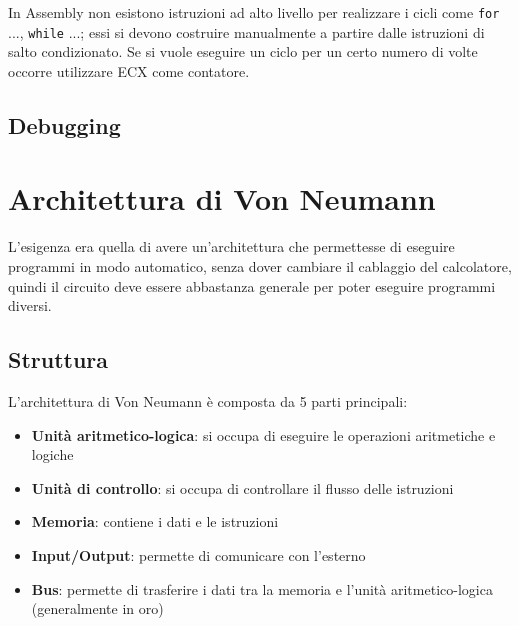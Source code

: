 \documentclass[a4paper]{article}
\theoremstyle{break}
\theoremstyle{break}
\theoremstyle{break}
\theoremstyle{break}
\begin{document}
\noindent In Assembly non esistono istruzioni ad alto livello per realizzare i cicli come \texttt{for} ...,
\texttt{while} ...; essi si devono costruire manualmente a partire dalle istruzioni di salto
condizionato. Se si vuole eseguire un ciclo per un certo numero di volte occorre utilizzare
ECX come contatore.

\subsection{Debugging}

\section{Architettura di Von Neumann}
L'esigenza era quella di avere un'architettura che permettesse di eseguire programmi
in modo automatico, senza dover cambiare il cablaggio del calcolatore, quindi il circuito
deve essere abbastanza generale per poter eseguire programmi diversi.

\subsection{Struttura}
L'architettura di Von Neumann è composta da 5 parti principali:
\begin{itemize}
	\item \textbf{Unità aritmetico-logica}: si occupa di eseguire le operazioni aritmetiche e logiche
	\item \textbf{Unità di controllo}: si occupa di controllare il flusso delle istruzioni
	\item \textbf{Memoria}: contiene i dati e le istruzioni
	\item \textbf{Input/Output}: permette di comunicare con l'esterno
	\item \textbf{Bus}: permette di trasferire i dati tra la memoria e l'unità aritmetico-logica (generalmente in oro)
\end{itemize}

\begin{figure}[H]
	\centering
\end{figure}
\end{document}
